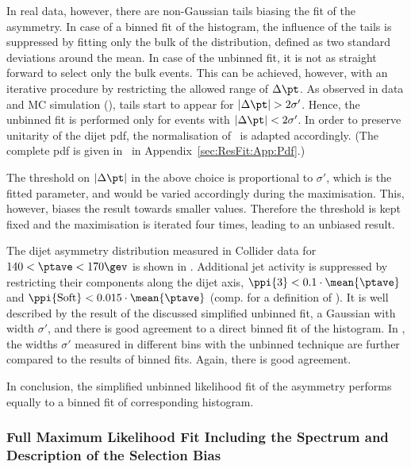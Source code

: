 In real data, however, there are non-Gaussian tails biasing the fit of the asymmetry.
In case of a binned fit of the histogram, the influence of the tails is suppressed by
fitting only the bulk of the distribution, defined as two standard deviations around the mean.
In case of the unbinned fit, it is not as straight
forward to select only the bulk events.
This can be achieved, however, with an iterative procedure by restricting
the allowed range of $\Delta\pt$.
As observed in data and MC simulation (), tails start to appear for \mbox{$|\Delta\pt| > 2\sigma'$}.
Hence, the unbinned fit is performed only for events with \mbox{$|\Delta\pt| < 2\sigma'$}.
In order to preserve unitarity of the dijet pdf, the normalisation
of~ is adapted accordingly.
(The complete pdf is given in~ in Appendix~\ref{sec:ResFit:App:Pdf}.)

The threshold on $|\Delta\pt|$ in the above choice is proportional to $\sigma'$, which is the fitted parameter, and would be varied accordingly during the maximisation.
This, however, biases the result towards smaller  values.
Therefore the threshold is kept fixed and the maximisation is iterated
four times, leading to an unbiased result.

The dijet asymmetry distribution measured in Collider data for \mbox{$140 <
  \ptave < 170\gev$} is shown in
.
Additional jet activity is suppressed by restricting their \pt components
along the dijet axis, \mbox{$\ppi{3} < 0.1\cdot\mean{\ptave}$} and
\mbox{$\ppi{\text{Soft}} < 0.015\cdot\mean{\ptave}$} (comp.  for
a definition of \pp).
It is well described by the result of the discussed simplified unbinned fit, \ie a Gaussian with width $\sigma'$, and there is good agreement to a direct binned fit of the histogram.
In , the widths $\sigma'$ measured in different \ptave bins with the unbinned technique are further compared to the results of binned fits.
Again, there is good agreement.

In conclusion, the simplified unbinned likelihood fit of the asymmetry performs equally to a binned fit of corresponding histogram.



\subsubsection{Full Maximum Likelihood Fit Including the Spectrum and Description of the Selection Bias}\label{sec:ResFit:DataDriven:FullFit}

